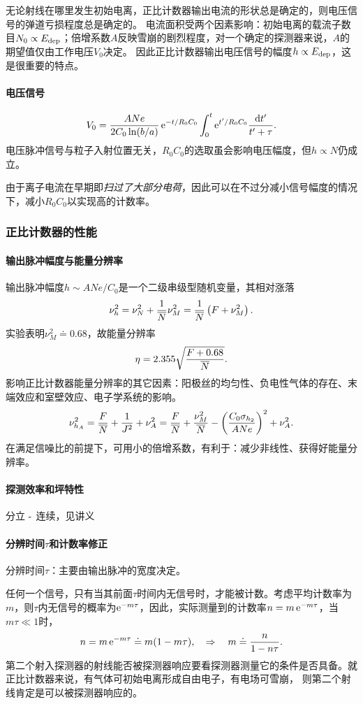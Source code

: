 无论射线在哪里发生初始电离，正比计数器输出电流的形状总是确定的，则电压信号的弹道亏损程度总是确定的。
电流面积受两个因素影响：初始电离的载流子数目$N_0\propto E_{\mathrm{dep}}$；倍增系数$A$反映雪崩的剧烈程度，对一个确定的探测器来说，$A$的期望值仅由工作电压$V_0$决定。
因此正比计数器输出电压信号的幅度$h\propto E_{\mathrm{dep}}$，这是很重要的特点。
\paragraph{电压信号}
\[
	V_0=\frac{ANe}{2C_0\ln(b/a)}\mathop{}\!\mathrm{e}^{-t/R_0C_0}\int_0^t\mathop{}\!\mathrm{e}^{t'/R_0C_0}\frac{\mathop{}\!\mathrm{d} t'}{t'+\tau}.
\]
电压脉冲信号与粒子入射位置无关，$R_0C_0$的选取虽会影响电压幅度，但$h\propto N$仍成立。

由于离子电流在早期即\textit{扫过了大部分电荷}，因此可以在不过分减小信号幅度的情况下，减小$R_0C_0$以实现高的计数率。
\subsubsection{正比计数器的性能}
\paragraph{输出脉冲幅度与能量分辨率}
输出脉冲幅度$h\sim ANe/C_0$是一个二级串级型随机变量，其相对涨落
\[
	\nu_h^2=\nu_N^2+\frac1{\overline N}\nu_M^2=\frac1{\overline N}\left(F+\nu_M^2\right).
\]
实验表明$\nu_M^2\doteq 0.68$，故能量分辨率
\begin{align}
	\eta=2.355\sqrt{\frac{F+0.68}{\overline N}}.
\end{align}
影响正比计数器能量分辨率的其它因素：阳极丝的均匀性、负电性气体的存在、末端效应和室壁效应、电子学系统的影响。
\[
	\nu_{h_A}^2=\frac F{\overline N}+\frac1{J^2}+\nu_A^2=\frac F{\overline N}+\frac{\nu_M^2}{\overline N}-\left(\frac{C_0\sigma_{h_2}}{ANe}\right)^2+\nu_A^2.
\]
在满足信噪比的前提下，可用小的倍增系数，有利于：减少非线性、获得好能量分辨率。
\paragraph{探测效率和坪特性}
分立$~\text{-}~$连续，见讲义
\paragraph{分辨时间$\tau$和计数率修正}
分辨时间$\tau$：主要由输出脉冲的宽度决定。%

任何一个信号，只有当其前面$\tau$时间内无信号时，才能被计数。考虑平均计数率为$m$，则$\tau$内无信号的概率为$\mathop{}\!\mathrm{e}^{-m\tau}$，因此，实际测量到的计数率$n=m\mathop{}\!\mathrm{e}^{-m\tau}$，当$m\tau\ll 1$时，
\begin{align}
	n=m\mathop{}\!\mathrm{e}^{-m\tau}\doteq m(1-m\tau),\quad\Rightarrow\quad m\doteq\frac n{1-n\tau}.
\end{align}
第二个射入探测器的射线能否被探测器响应要看探测器测量它的条件是否具备。就正比计数器来说，有气体可初始电离形成自由电子，有电场可雪崩，%
则第二个射线肯定是可以被探测器响应的。%

